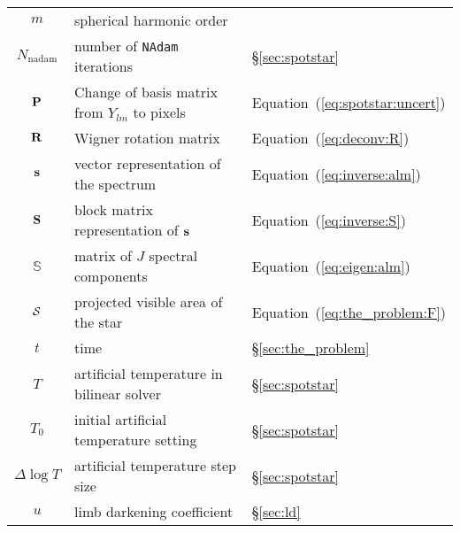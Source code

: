 \documentclass[modern]{aastex631}
\begin{document}
\begin{center}
\begin{longtable}{cll}
        $m$                                                 & spherical harmonic order                                     &                                            \\
        $N_\mathrm{nadam}$                                  & number of \texttt{NAdam} iterations                          & \S\ref{sec:spotstar}                       \\
        ${\mathbf{P}}$                                          & Change of basis matrix from $Y_{lm}$ to pixels               & Equation~(\ref{eq:spotstar:uncert})        \\
        ${\mathbf{R}}$                                          & Wigner rotation matrix                                       & Equation~(\ref{eq:deconv:R})               \\
        ${\mathbf{s}}$                                          & vector representation of the spectrum                        & Equation~(\ref{eq:inverse:alm})          \\
        ${\mathbf{S}}$                                          & block matrix representation of ${\mathbf{s}}$                    & Equation~(\ref{eq:inverse:S})              \\
        $\boldsymbol{\mathbb{S}}$                           & matrix of $J$ spectral components                            & Equation~(\ref{eq:eigen:alm})            \\
        $\mathcal{S}$                                             & projected visible area of the star                           & Equation~(\ref{eq:the_problem:F})          \\
        $t$                                                 & time                                                         & \S\ref{sec:the_problem}                    \\
        $T$                                                 & artificial temperature in bilinear solver                    & \S\ref{sec:spotstar}                       \\
        $T_0$                                               & initial artificial temperature setting                       & \S\ref{sec:spotstar}                       \\
        $\Delta\log T$                                      & artificial temperature step size                             & \S\ref{sec:spotstar}                       \\
        $u$                                                 & limb darkening coefficient                                   & \S\ref{sec:ld}                             \\

\end{longtable}
\end{center}
\end{document}
